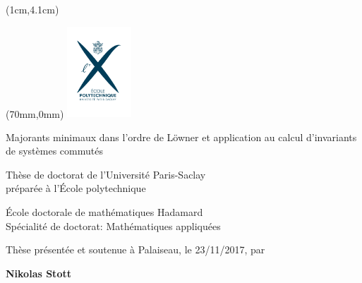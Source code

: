 \documentclass[a4paper]{article}
\begin{document}
\begin{textblock*}{5cm}(1cm,4.1cm)
\end{textblock*}

\begin{textblock*}{133mm}(70mm,0mm)
\hfill
\includegraphics[height=3.4cm]{images/image28}
\end{textblock*}

\begin{flushright}
\color{bordeau}
\Huge Majorants minimaux dans l'ordre de L\"owner et application au calcul d'invariants de systèmes commutés
\end{flushright}

\vspace*{2mm}

\begin{flushright}
\large
Thèse de doctorat de l'Université Paris-Saclay \\
préparée à l'\'Ecole polytechnique
\end{flushright}

\vspace*{2mm}

\begin{flushright}
\large
\'Ecole doctorale  de mathématiques Hadamard \\
Spécialité de doctorat: Mathématiques appliquées
\end{flushright}

\vspace*{3mm}

\begin{flushright}
\small Thèse présentée et soutenue à Palaiseau, le 23/11/2017, par
\end{flushright}

\begin{flushright}
\bf \LARGE Nikolas Stott~~
\end{flushright}

\vspace*{6mm}
\end{document}
